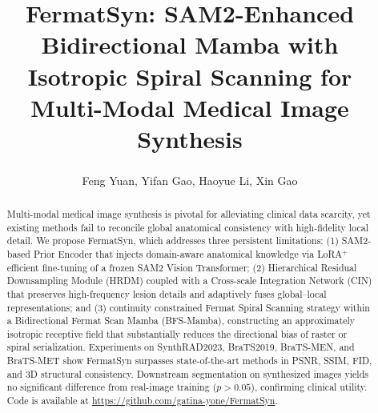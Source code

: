 \documentclass[runningheads]{llncs}
\begin{document}
\title{FermatSyn: SAM2-Enhanced Bidirectional Mamba with Isotropic Spiral Scanning for Multi-Modal Medical Image Synthesis}
\author{Feng Yuan, %
Yifan Gao,  %
Haoyue Li, %
Xin Gao\textsuperscript{} } %
\maketitle              %

\begin{abstract}
Multi-modal medical image synthesis is pivotal for alleviating
clinical data scarcity, yet existing methods fail to reconcile
global anatomical consistency with high-fidelity local detail.
We propose FermatSyn, which addresses three persistent
limitations:
(1) SAM2-based Prior Encoder that injects domain-aware
anatomical knowledge via LoRA$^{+}$ efficient fine-tuning of a
frozen SAM2 Vision Transformer;
(2) Hierarchical Residual Downsampling Module (HRDM)
coupled with a Cross-scale Integration Network (CIN) that
preserves high-frequency lesion details and adaptively fuses
global--local representations; and
(3) continuity constrained Fermat Spiral Scanning
strategy within a Bidirectional Fermat Scan Mamba (BFS-Mamba),
constructing an approximately isotropic receptive field that
substantially reduces the directional bias of raster or spiral serialization.
Experiments on SynthRAD2023, BraTS2019, BraTS-MEN, and BraTS-MET
show FermatSyn surpasses state-of-the-art methods in PSNR, SSIM,
FID, and 3D structural consistency.
Downstream segmentation on synthesized images yields no significant
difference from real-image training ($p{>}0.05$), confirming
clinical utility. Code is available at \url{https://github.com/gatina-yone/FermatSyn}.




\end{abstract}
\end{document}
